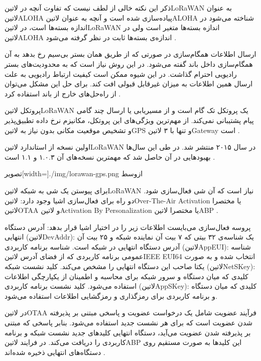 ذکر این نکته خالی از لطف نیست که تفاوت آنچه در ‌لاتین{LoRaWAN} به عنوان ‌لاتین{ALOHA} پیاده‌سازی شده است و آنچه به عنوان ‌لاتین{ALOHA} شناخته می‌شود در اندازه بسته‌ها است،
در ‌لاتین{LoRaWAN} اندازه بسته‌ها متغیر است ولی در ‌لاتین{ALOHA} اندازه‌ی بسته‌ها ثابت در نظر گرفته می‌شود
.

ارسال اطلاعات همگام‌سازی در صورتی که از طریق همان بستر بی‌سیم رخ بدهد به آن همگام‌سازی داخل باند گفته می‌شود. در این روش نیاز است که به محدودیت‌های بستر رادیویی احترام گذاشت.
در این شیوه ممکن است کیفیت ارتباط رادیویی به علت ارسال همین اطلاعات به میزان غیرقابل قبولی افت کند. برای حل این مشکل می‌توان از راه‌حل‌های خارج از باند استفاده کرد
.

پروتکل ‌لاتین{LoRaWAN} یک پروتکل تک گام است و از مسیریابی یا ارسال چند گامی پیام پشتیبانی نمی‌کند. از مهم‌ترین ویژگی‌های این پروتکل، مکانیزم نرخ داده تطبیق‌پذیر و تشخیص
موقعیت مکانی بدون نیاز به ‌لاتین{GPS} و تنها با ۳ ‌لاتین{Gateway} است
.

اولین نسخه از استاندارد ‌لاتین{LoRaWAN} در سال ۲۰۱۵ منتشر شد. در طی این سال‌ها بهبودهایی در آن حاصل شد که مهمترین نسخه‌های آن ۱.۰.۳ و ۱.۱ است
.

‌تصویر[width=\textwidth]{./img/lorawan-gps.png}
‌ازوسط

برای پیوستن یک شی به شبکه ‌لاتین{LoRaWAN} نیاز است که آن شی فعال‌سازی شود. دو راه برای فعال‌سازی اشیا وجود دارد: ‌لاتین{Over-The-Air Activation} یا مختصرا ‌لاتین{OTAA}
و ‌لاتین{Activation By Personalization} یا مختصرا ‌لاتین{ABP}
.

پروسه فعال‌سازی می‌بایست اطلاعات زیر را در اختیار اشیا قرار بدهد:
 آدرس دستگاه انتهایی (‌لاتین{DevAddr}): یک شناسه‌ی ۳۲ بیتی که ۷ بیت آن نماینده شبکه و ۲۵ بیت آن آدرس دستگاه انتهایی در شبکه است.
 شناسه برنامه کاربردی (‌لاتین{AppEUI}): شناسه عمومی برنامه کاربردی که از فضای آدرس ‌لاتین{IEEE EUI64} انتخاب شده و به صورت یکتا صاحب این دستگاه انتهایی را مشخص می‌کند.
 کلید نشست شبکه (‌لاتین{NetSKey}): کلیدی که میان دستگاه و سرور شبکه برای محاسبه و اطمینان از یکپارچگی اطلاعات استفاده می‌شود.
 کلید نشست برنامه کاربردی (‌لاتین{AppSKey}): کلیدی که میان دستگاه و برنامه کاربردی برای رمزگذاری و رمزگشایی اطلاعات استفاده می‌شود.

در ‌لاتین{OTAA} فرآیند عضویت شامل یک درخواست عضویت و پاسخی مبتنی بر پذیرفته شدن عضویت است که برای هر نشست جدید استفاده می‌شود.
بنابر پاسخی که مبتنی بر پذیرفته شدن عضویت می‌آید، دستگاه انتهایی کلیدهای جدید نشست شبکه و برنامه کاربردی را دریافت می‌کند.
در فرایند ‌لاتین{ABP} این کلیدها به صورت مستقیم روی دستگاه‌های انتهایی ذخیره شده‌اند
.

